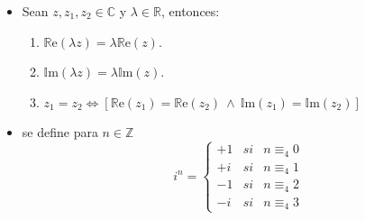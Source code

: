 \documentclass[letterpaper,10pt]{article}
\newcommand{\R}{\mathbb R}
\newcommand{\Z}{\mathbb Z}
\newcommand{\re}{\mathbb R \text{e}}
\newcommand{\im}{\mathbb I \text{m}}
\newcommand{\C}{\mathbb C}
\theoremstyle{plain}
\begin{document}
\begin{framed}
\begin{multicols}{2}
\begin{itemize}
            \item Sean $z,z_1,z_2 \in \C$ y $\lambda \in \R$, entonces:
                \begin{enumerate}
                    \item $\re (\lambda z)= \lambda \re (z)$.
                    \item $\im (\lambda z)= \lambda \im (z)$.
                    \item $z_1 = z_2 \Leftrightarrow [\re (z_1) = \re (z_2) \:\land\: \im (z_1) =\im (z_2)]$
                \end{enumerate}
            \item se define para $n\in \Z$
            $$i^n= \left\{ \begin{array}{lcc}
                         +1 &   si  & n\equiv_{4} 0 \\
                          +i &  si & n\equiv_{4} 1 \\
                          -1 &  si  & n\equiv_{4} 2 \\
                          -i & si & n\equiv_{4} 3
                         \end{array}
               \right.
            $$
            

\end{itemize}
\end{multicols}
\end{framed}
\end{document}
